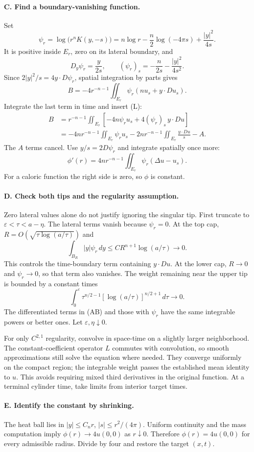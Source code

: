 \begin{expandedproof}
\paragraph{C. Find a boundary-vanishing function.}
Set
\[
 \psi_r=\log\big(r^nK(y,-s)\big)
 =n\log r-\frac n2\log(-4\pi s)+\frac{|y|^2}{4s}.
\]
It is positive inside $E_r$, zero on its lateral boundary, and
\[
 D_y\psi_r=\frac{y}{2s},\qquad
 (\psi_r)_s=-\frac n{2s}-\frac{|y|^2}{4s^2}.
 \tag{L}
\]
Since $2|y|^2/s=4y\cdot D\psi_r$, spatial integration by parts gives
\[
 B=-4r^{-n-1}\iint_{E_r}\psi_r(nu_s+y\cdot Du_s).
\]
Integrate the last term in time and insert (L):
\[
 \begin{split}
 B&=r^{-n-1}\iint_{E_r}
       [-4n\psi_ru_s+4(\psi_r)_s\,y\cdot Du]\\
 &=-4nr^{-n-1}\iint_{E_r}\psi_ru_s
   -2nr^{-n-1}\iint_{E_r}\frac{y\cdot Du}{s}-A.
 \end{split}
\]
The $A$ terms cancel. Use $y/s=2D\psi_r$ and integrate spatially once more:
\[
 \boxed{\phi'(r)=4nr^{-n-1}
                 \iint_{E_r}\psi_r(\Delta u-u_s).}
 \tag{R}
\]
For a caloric function the right side is zero, so $\phi$ is constant.

\paragraph{D. Check both tips and the regularity assumption.}
Zero lateral values alone do not justify ignoring the singular tip.
First truncate to $\varepsilon<\tau<a-\eta$.
The lateral terms vanish because $\psi_r=0$.
At the top cap,
$R=O(\sqrt{\tau\log(a/\tau)})$ and
\[
 \int_{B_R}|y|\psi_r\,dy
 \leq C R^{n+1}\log(a/\tau)\longrightarrow0.
\]
This controls the time-boundary term containing $y\cdot Du$.
At the lower cap, $R\to0$ and $\psi_r\to0$, so that term also vanishes.
The weight remaining near the upper tip is bounded by a constant times
\[
 \int_0^\varepsilon
 \tau^{n/2-1}[\log(a/\tau)]^{n/2+1}\,d\tau\longrightarrow0.
\]
The differentiated terms in (AB) and those with $\psi_r$ have the same
integrable powers or better ones. Let $\varepsilon,\eta\downarrow0$.

For only $C^{2,1}$ regularity, convolve in space-time on a slightly larger
neighborhood. The constant-coefficient operator $L$ commutes with
convolution, so smooth approximations still solve the equation where
needed. They converge uniformly on the compact region; the integrable
weight passes the established mean identity to $u$.
This avoids requiring mixed third derivatives in the original function.
At a terminal cylinder time, take limits from interior target times.

\paragraph{E. Identify the constant by shrinking.}
The heat ball lies in $|y|\leq C_nr$, $|s|\leq r^2/(4\pi)$.
Uniform continuity and the mass computation imply
$\phi(r)\to4u(0,0)$ as $r\downarrow0$.
Therefore $\phi(r)=4u(0,0)$ for every admissible radius.
Divide by four and restore the target $(x,t)$.
\end{expandedproof}
